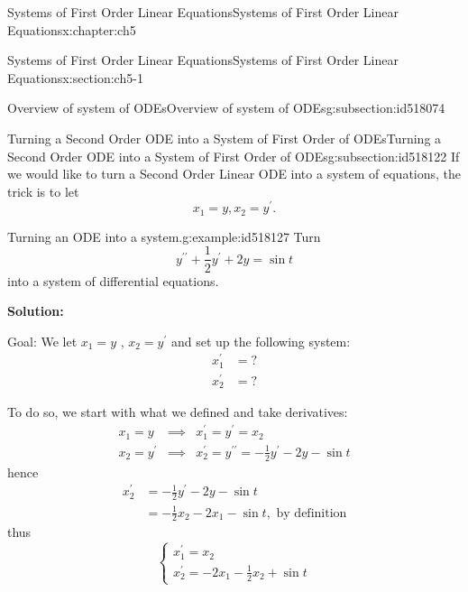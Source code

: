 \documentclass[oneside,10pt,]{book}
\newcommand{\terminology}[1]{\textbf{#1}}
\numberwithin{equation}{section}
\numberwithin{equation}{section}
\newcommand{\amp}{&}
\begin{document}
\begin{chapterptx}{Systems of First Order Linear Equations}{}{Systems of First Order Linear Equations}{}{}{x:chapter:ch5}
\begin{sectionptx}{Systems of First Order Linear Equations}{}{Systems of First Order Linear Equations}{}{}{x:section:ch5-1}
\begin{subsectionptx}{Overview of system of ODEs}{}{Overview of system of ODEs}{}{}{g:subsection:id518074}
\end{subsectionptx}
%
%
\typeout{************************************************}
\typeout{************************************************}
%
\begin{subsectionptx}{Turning a Second Order ODE into a System of First Order of ODEs}{}{Turning a Second Order ODE into a System of First Order of ODEs}{}{}{g:subsection:id518122}
If we would like to turn a Second Order Linear ODE into a system of equations, the trick is to let%
\begin{equation*}
x_{1}=y,x_{2}=y^{\prime}.
\end{equation*}
%
\begin{example}{Turning an ODE into a system.}{g:example:id518127}%
Turn%
\begin{equation*}
y^{\prime\prime}+\frac{1}{2}y^{\prime}+2y=\sin t
\end{equation*}
into a system of differential equations.%
\par
\terminology{Solution:}%
\par
Goal:  We let \(x_{1}=y\) , \(x_{2}=y^{\prime}\) and set up the following system:%
\begin{align*}
x_{1}^{\prime} \amp =?\\
x_{2}^{\prime} \amp =? 
\end{align*}
%
\par
To do so, we start with what we defined and take derivatives:%
\begin{equation*}
\begin{array}{ccc}
x_{1}=y \amp \implies \amp x_{1}^{\prime}=y^{\prime}=x_{2}\\
x_{2}=y^{\prime} \amp \implies \amp  x_{2}^{\prime}=y^{\prime\prime}=-\frac{1}{2}y^{\prime}-2y-\sin t
\end{array}
\end{equation*}
hence%
\begin{align*}
x_{2}^{\prime} \amp =-\frac{1}{2}y^{\prime}-2y-\sin t \\
\amp =-\frac{1}{2}x_{2}-2x_{1}-\sin t,\text{ by definition} 
\end{align*}
thus%
\begin{equation*}
\begin{cases}
x_{1}^{\prime}=x_{2}\\
x_{2}^{\prime}=-2x_{1}-\frac{1}{2}x_{2}+\sin t
\end{cases}
\end{equation*}
%

\end{example}
\end{subsectionptx}
\end{sectionptx}
\end{chapterptx}
\end{document}
